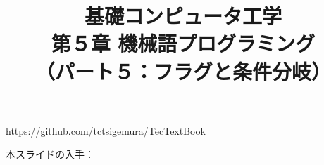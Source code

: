 \documentclass[handout]{beamer}        %
\begin{document}
\title{基礎コンピュータ工学\\第５章 機械語プログラミング\\
       （パート５：フラグと条件分岐）}
\date{}

\begin{frame}
  \titlepage
  \centerline{\url{https://github.com/tctsigemura/TecTextBook}}
  \vfill
  \centerline{本スライドの入手：
    }
\end{frame}

\end{document}
